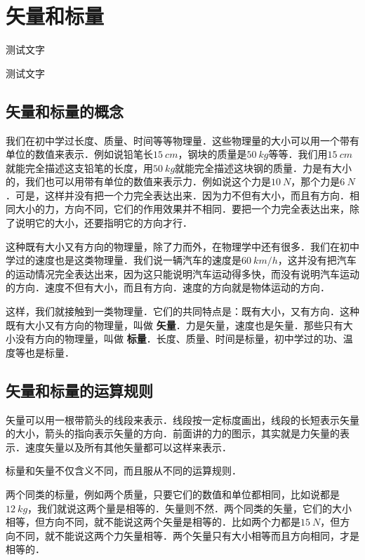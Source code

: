 \section{矢量和标量}

\begin{Point*}
	测试文字
\end{Point*}

\begin{Case*}
	\item 测试文字
\end{Case*}

\subsection{矢量和标量的概念}

我们在初中学过长度、质量、时间等等物理量．这些物理量的大小可以用一个带有单位的数值来表示．例如说铅笔长$\qty{15}{cm}$，钢块的质量是$\qty{50}{kg}$等等．我们用$\qty{15}{cm}$就能完全描述这支铅笔的长度，用$\qty{50}{kg}$就能完全描述这块钢的质量．力是有大小的，我们也可以用带有单位的数值来表示力．例如说这个力是$\qty{10}{N}$，那个力是$\qty{6}{N}$．可是，这样并没有把一个力完全表达出来．因为力不但有大小，而且有方向．相同大小的力，方向不同，它们的作用效果并不相同．要把一个力完全表达出来，除了说明它的大小，还要指明它的方向才行．

这种既有大小又有方向的物理量，除了力而外，在物理学中还有很多．我们在初中学过的速度也是这类物理量．我们说一辆汽车的速度是$\qty{60}{km/h}$，这并没有把汽车的运动情况完全表达出来，因为这只能说明汽车运动得多快，而没有说明汽车运动的方向．速度不但有大小，而且有方向．速度的方向就是物体运动的方向．

这样，我们就接触到一类物理量．它们的共同特点是：既有大小，又有方向．这种既有大小又有方向的物理量，叫做\textbf{ 矢量}．力是矢量，速度也是矢量．那些只有大小没有方向的物理量，叫做\textbf{ 标量}．长度、质量、时间是标量，初中学过的功、温度等也是标量．


\subsection{矢量和标量的运算规则}
矢量可以用一根带箭头的线段来表示．线段按一定标度画出，线段的长短表示矢量的大小，箭头的指向表示矢量的方向．前面讲的力的图示，其实就是力矢量的表示．速度矢量以及所有其他矢量都可以这样来表示．

标量和矢量不仅含义不同，而且服从不同的运算规则．

两个同类的标量，例如两个质量，只要它们的数值和单位都相同，比如说都是$\qty{12}{kg}$，我们就说这两个量是相等的．矢量则不然．两个同类的矢量，它们的大小相等，但方向不同，就不能说这两个矢量是相等的．比如两个力都是$\qty{15}{N}$，但方向不同，就不能说这两个力矢量相等．两个矢量只有大小相等而且方向相同，才是相等的．


